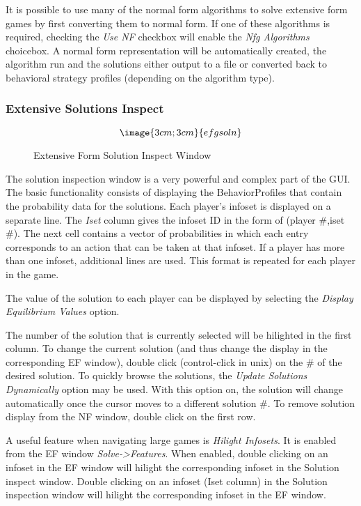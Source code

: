 It is possible to use many of the normal form algorithms to solve
extensive form games by first converting them to normal form.  If one of
these algorithms is required, checking the {\em Use NF} checkbox will
enable the {\em Nfg Algorithms} choicebox.  A normal form representation
will be automatically created, the algorithm run and the solutions either
output to a file or converted back to behavioral strategy profiles
(depending on the algorithm type).

\subsubsection{Extensive Solutions Inspect}\label{ExtensiveSolutionInspect}
\begin{figure}
$$\image{3cm;3cm}{efgsoln}$$
\caption{Extensive Form Solution Inspect Window}\label{fig:nfgsoln}
\end{figure}

The solution inspection window is a very powerful and complex part of the GUI.
The basic functionality consists of displaying the BehaviorProfiles that contain the
probability data for the solutions.  Each player's infoset is displayed on a separate
line.  The {\em Iset} column gives the infoset ID in the form of (player \#,iset \#).
The next cell contains a vector of probabilities in which each entry corresponds to
an action that can be taken at that infoset.  If a player has more than one infoset,
additional lines are used.  This format is repeated for each player in the game.

The value of the solution to each player can be displayed by selecting the 
{\em Display Equilibrium Values} option.

The number of the solution that is currently selected will be hilighted in the first
column.  To change the current solution (and thus change the display in the 
corresponding EF window), double click (control-click in unix) on the \# of the
desired solution.  To quickly browse the solutions, the {\em Update Solutions Dynamically}
option may be used.  With this option on, the solution will change automatically once
the cursor moves to a different solution \#.  To remove solution display from the NF window,
double click on the first row.

A useful feature when navigating large games is {\em Hilight Infosets}.  It is enabled
from the EF window {\em Solve->Features}.  When enabled, double clicking on an
infoset in the EF window will hilight the corresponding infoset in the Solution inspect
window.  Double clicking on an infoset (Iset column) in the Solution inspection window
will hilight the corresponding infoset in the EF window.

